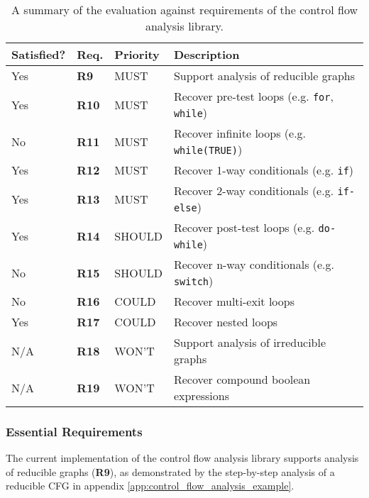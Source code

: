 \begin{table}[htbp]
	\begin{center}
		\begin{tabular}{|l|l|l|l|}
			\hline
			Satisfied? & Req. & Priority & Description \\
			\hline
			Yes & \textbf{R9} & MUST & Support analysis of reducible graphs \\
			Yes & \textbf{R10} & MUST & Recover pre-test loops (e.g. \texttt{for}, \texttt{while}) \\
			No & \textbf{R11} & MUST & Recover infinite loops (e.g. \texttt{while(TRUE)}) \\
			Yes & \textbf{R12} & MUST & Recover 1-way conditionals (e.g. \texttt{if}) \\
			Yes & \textbf{R13} & MUST & Recover 2-way conditionals (e.g. \texttt{if-else}) \\
			Yes & \textbf{R14} & SHOULD & Recover post-test loops (e.g. \texttt{do-while}) \\
			No & \textbf{R15} & SHOULD & Recover n-way conditionals (e.g. \texttt{switch}) \\
			No & \textbf{R16} & COULD & Recover multi-exit loops \\
			Yes & \textbf{R17} & COULD & Recover nested loops \\
			N/A & \textbf{R18} & WON'T & Support analysis of irreducible graphs \\
			N/A & \textbf{R19} & WON'T & Recover compound boolean expressions \\
			\hline
		\end{tabular}
	\end{center}
	\caption{A summary of the evaluation against requirements of the control flow analysis library.}
	\label{tbl:eval_summary_of_control_flow_analysis_library}
\end{table}


\subsubsection{Essential Requirements}
\label{sec:eval_control_flow_analysis_library_essential_requirements}


The current implementation of the control flow analysis library supports analysis of reducible graphs (\textbf{R9}), as demonstrated by the step-by-step analysis of a reducible CFG in appendix \ref{app:control_flow_analysis_example}.

